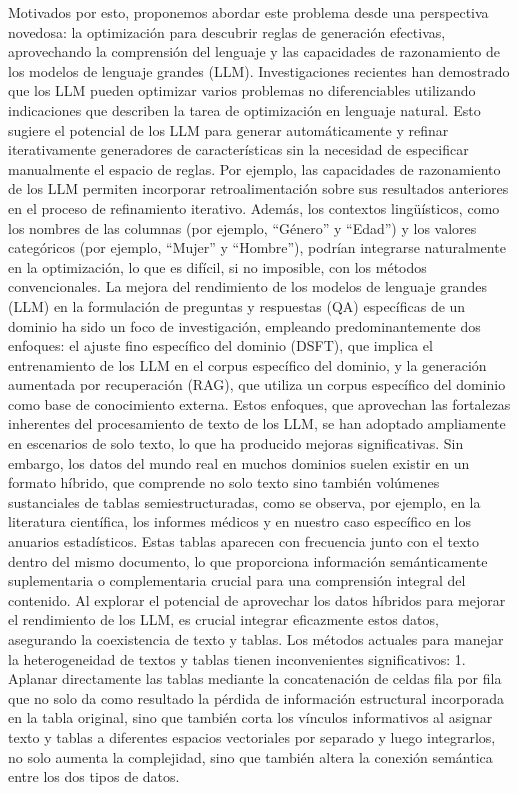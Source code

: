 Motivados por esto, proponemos abordar este problema desde una perspectiva novedosa: la optimización para descubrir reglas de generación efectivas, aprovechando la comprensión del lenguaje y las capacidades de razonamiento de los modelos de lenguaje grandes (LLM). Investigaciones recientes han demostrado que los LLM pueden optimizar varios problemas no diferenciables utilizando indicaciones que describen la tarea de optimización en lenguaje natural. Esto sugiere el potencial de los LLM para generar automáticamente y refinar iterativamente generadores de características sin la necesidad de especificar manualmente el espacio de reglas. Por ejemplo, las capacidades de razonamiento de los LLM permiten incorporar retroalimentación sobre sus resultados anteriores en el proceso de refinamiento iterativo. Además, los contextos lingüísticos, como los nombres de las columnas (por ejemplo, “Género” y “Edad”) y los valores categóricos (por ejemplo, “Mujer” y “Hombre”), podrían integrarse naturalmente en la optimización, lo que es difícil, si no imposible, con los métodos convencionales.
La mejora del rendimiento de los modelos de lenguaje grandes (LLM) en la formulación de preguntas y respuestas (QA) específicas de un dominio ha sido un foco de investigación, empleando predominantemente dos enfoques: el ajuste fino específico del dominio (DSFT), que implica el entrenamiento de los LLM en el corpus específico del dominio, y la generación aumentada por recuperación (RAG), que utiliza un corpus específico del dominio como base de conocimiento externa. Estos enfoques, que aprovechan las fortalezas inherentes del procesamiento de texto de los LLM, se han adoptado ampliamente en escenarios de solo texto, lo que ha producido mejoras significativas.
Sin embargo, los datos del mundo real en muchos dominios suelen existir en un formato híbrido, que comprende no solo texto sino también volúmenes sustanciales de tablas semiestructuradas, como se observa, por ejemplo, en la literatura científica, los informes médicos y en nuestro caso específico en los anuarios estadísticos. Estas tablas aparecen con frecuencia junto con el texto dentro del mismo documento, lo que proporciona información semánticamente suplementaria o complementaria crucial para una comprensión integral del contenido. Al explorar el potencial de aprovechar los datos híbridos para mejorar el rendimiento de los LLM, es crucial integrar eficazmente estos datos, asegurando la coexistencia de texto y tablas. Los métodos actuales para manejar la heterogeneidad de textos y tablas tienen inconvenientes significativos:
1.	Aplanar directamente las tablas mediante la concatenación de celdas fila por fila que no solo da como resultado la pérdida de información estructural incorporada en la tabla original, sino que también corta los vínculos informativos al asignar texto y tablas a diferentes espacios vectoriales por separado y luego integrarlos, no solo aumenta la complejidad, sino que también altera la conexión semántica entre los dos tipos de datos.

